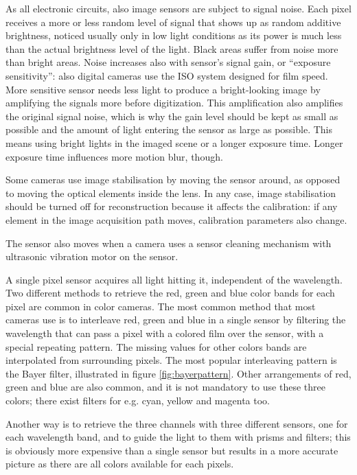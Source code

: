 
As all electronic circuits, also image sensors are subject to signal noise.
Each pixel receives a more or less random level of signal that shows up as random additive brightness, noticed usually only in low light conditions as its power is much less than the actual brightness level of the light.
Black areas suffer from noise more than bright areas.
Noise increases also with sensor's signal gain, or ``exposure sensitivity'': also digital cameras use the ISO system designed for film speed.
More sensitive sensor needs less light to produce a bright-looking image by amplifying the signals more before digitization.
This amplification also amplifies the original signal noise, which is why the gain level should be kept as small as possible and the amount of light entering the sensor as large as possible.
This means using bright lights in the imaged scene or a longer exposure time.
Longer exposure time influences more motion blur, though.


Some cameras use image stabilisation by moving the sensor around, as opposed to moving the optical elements inside the lens.
In any case, image stabilisation should be turned off for reconstruction because it affects the calibration: if any element in the image acquisition path moves, calibration parameters also change.

The sensor also moves when a camera uses a sensor cleaning mechanism with ultrasonic vibration motor on the sensor.


A single pixel sensor acquires all light hitting it, independent of the wavelength.
Two different methods to retrieve the red, green and blue color bands for each pixel are common in color cameras.
The most common method that most cameras use is to interleave red, green and blue in a single sensor by filtering the wavelength that can pass a pixel with a colored film over the sensor, with a special repeating pattern.
The missing values for other colors bands are interpolated from surrounding pixels.
The most popular interleaving pattern is the Bayer filter, illustrated in figure \ref{fig:bayerpattern}.
Other arrangements of red, green and blue are also common, and it is not mandatory to use these three colors; there exist filters for e.g. cyan, yellow and magenta too.

Another way is to retrieve the three channels with three different sensors, one for each wavelength band, and to guide the light to them with prisms and filters; this is obviously more expensive than a single sensor but results in a more accurate picture as there are all colors available for each pixels.

